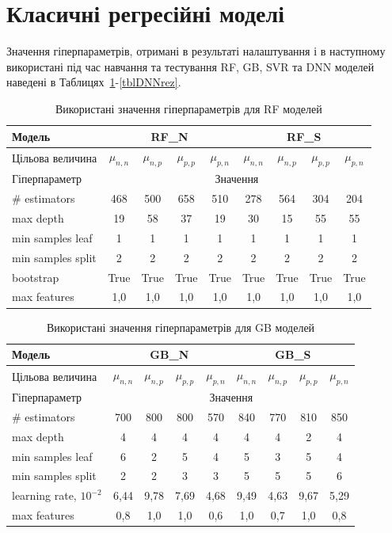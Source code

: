 \documentclass[12pt,a4paper,titlepage,oneside]{book}
\numberwithin{equation}{part}
\begin{document}
\section{Класичні регресійні моделі}

Значення гіперпараметрів, отримані в результаті налаштування і в наступному використані під час навчання та тестування RF, GB, SVR та DNN моделей
наведені в Таблицях~\ref{tblRFrez}-\ref{tblDNNrez}.

\begin{table}
\setlength{\tabcolsep}{3pt}
\caption{Використані значення гіперпараметрів для RF моделей}
\label{tblRFrez}
\centering
\begin{tabular}{|l|c|c|c|c|c|c|c|c|}
\hline
Модель& \multicolumn{4}{c|}{RF\_N}& \multicolumn{4}{c|}{RF\_S} \rule{0pt}{11pt}\\
\hline
Цільова величина&$\mu_{n,n}$&$\mu_{n,p}$&$\mu_{p,p}$&$\mu_{p,n}$&$\mu_{n,n}$&$\mu_{n,p}$&$\mu_{p,p}$&$\mu_{p,n}$\\
\hline
Гіперпараметр&\multicolumn{8}{c|}{Значення}\\
\hline
\# estimators&468&500&658&510&278&564&304&204\\
\hline
max depth&19&58&37&19&30&15&55&55\\
\hline
min samples leaf &1&1&1&1&1&1&1&1\\
\hline
min samples split	&2&2&2&2&2&2&2&2\\
\hline
bootstrap	&True&True&True&True&True&True&True&True\\
\hline
max features &1,0&1,0&1,0&1,0&1,0&1,0&1,0&1,0\\
\hline
\end{tabular}
\end{table}


\begin{table}[!ht]
\setlength{\tabcolsep}{3pt}
\caption{Використані значення гіперпараметрів для GB моделей}
\label{tblGBrez}
\centering
\begin{tabular}{|l|c|c|c|c|c|c|c|c|}
\hline
Модель& \multicolumn{4}{c|}{GB\_N}& \multicolumn{4}{c|}{GB\_S} \rule{0pt}{11pt}\\
\hline
Цільова величина&$\mu_{n,n}$&$\mu_{n,p}$&$\mu_{p,p}$&$\mu_{p,n}$&$\mu_{n,n}$&$\mu_{n,p}$&$\mu_{p,p}$&$\mu_{p,n}$\\
\hline
Гіперпараметр&\multicolumn{8}{c|}{Значення}\\
\hline
\# estimators&700&800&800&570&840&770&810&850\\
\hline
max depth&4&4&4&4&4&4&2&4\\
\hline
min samples leaf &6&2&5&4&5&3&5&4\\
\hline
min samples split	&2&2&3&3&5&5&5&6\\
\hline
learning rate, $10^{-2}$	&6,44&9,78&7,69&4,68&9,49&4,63&9,67&5,29\\
\hline
max features &0,8&1,0&1,0&0,6&1,0&0,7&1,0&0,8\\
\hline
\end{tabular}
\end{table}
\end{document}
